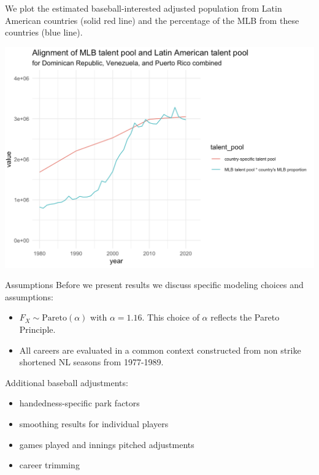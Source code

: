 \documentclass[
  ignorenonframetext,
]{beamer}
\providecommand{\tightlist}{%
  \setlength{\itemsep}{0pt}\setlength{\parskip}{0pt}}
\begin{document}
\begin{frame}{}
\protect\hypertarget{section-11}{}
We plot the estimated baseball-interested adjusted population from Latin
American countries (solid red line) and the percentage of the MLB from
these countries (blue line).

\includegraphics{DRVen_pop.png}
\end{frame}

\begin{frame}{Assumptions}
\protect\hypertarget{assumptions}{}
Before we present results we discuss specific modeling choices and
assumptions:

\begin{itemize}
\tightlist
\item
  \(F_X \sim \text{Pareto}(\alpha)\) with \(\alpha = 1.16\). This choice
  of \(\alpha\) reflects the Pareto Principle.
\item
  All careers are evaluated in a common context constructed from non
  strike shortened NL seasons from 1977-1989.
\end{itemize}

\vspace{12pt}

Additional baseball adjustments:

\begin{itemize}
\tightlist
\item
  handedness-specific park factors
\item
  smoothing results for individual players
\item
  games played and innings pitched adjustments
\item
  career trimming
\end{itemize}
\end{frame}
\end{document}
